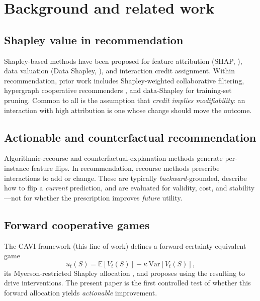 \documentclass[pdflatex,sn-mathphys-num]{sn-jnl}%
\theoremstyle{thmstyleone}%
\theoremstyle{thmstyletwo}%
\theoremstyle{thmstylethree}%
\newcommand{\CAV}{\mathrm{CAV}}
\begin{document}
\section{Background and related work}\label{sec2}

\subsection{Shapley value in recommendation}

Shapley-based methods have been proposed for feature attribution (SHAP, \cite{lundberg2017}), data valuation (Data Shapley, \cite{ghorbani2019datashapley}), and interaction credit assignment. Within recommendation, prior work includes Shapley-weighted collaborative filtering, hypergraph cooperative recommenders \cite{louhichi2026dyhucog}, and data-Shapley for training-set pruning. Common to all is the assumption that \emph{credit implies modifiability}: an interaction with high attribution is one whose change should move the outcome.

\subsection{Actionable and counterfactual recommendation}

Algorithmic-recourse and counterfactual-explanation methods \cite{wachter2017counterfactual,ustun2019actionable} generate per-instance feature flips. In recommendation, recourse methods prescribe interactions to add or change. These are typically \emph{backward}-grounded, describe how to flip a \emph{current} prediction, and are evaluated for validity, cost, and stability---not for whether the prescription improves \emph{future} utility.

\subsection{Forward cooperative games}

The CAVI framework (this line of work) defines a forward certainty-equivalent game
\begin{equation}\label{eq:game}
u_t(S) = \mathbb{E}[V_t(S)] - \kappa\,\mathrm{Var}[V_t(S)],
\end{equation}
its Myerson-restricted Shapley allocation \cite{myerson1977,vandenNouweland1992}, and proposes using the resulting \CAV{} to drive interventions. The present paper is the first controlled test of whether this forward allocation yields \emph{actionable} improvement.
\end{document}
